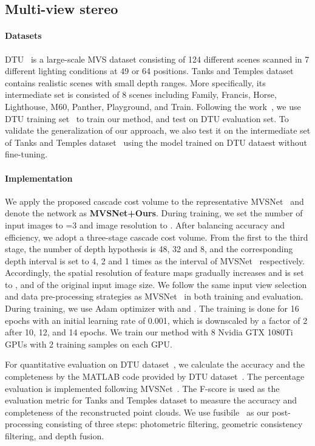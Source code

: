 \documentclass[10pt,twocolumn,letterpaper]{article}
\begin{document}
\subsection{Multi-view stereo} 
\paragraph{Datasets}
DTU~\cite{aanaes2016dtu} is a large-scale MVS dataset consisting of 124 different scenes scanned in 7 different lighting conditions at 49 or 64 positions. Tanks and Temples dataset~\cite{knapitsch2017tanks} contains realistic scenes with small depth ranges.
More specifically, its intermediate set is consisted of 8 scenes including Family, Francis, Horse, Lighthouse, M60, Panther, Playground, and Train.
Following the work~\cite{yao2019recurrent}, we use DTU training set~\cite{aanaes2016dtu} to train our method,
and test on DTU evaluation set.
To validate the generalization of our approach, we also test it on the intermediate set of Tanks and Temples dataset~\cite{knapitsch2017tanks} using the model trained on DTU dataest without fine-tuning.


\paragraph{Implementation}\vspace{-2mm}
We apply the proposed cascade cost volume to the representative MVSNet~\cite{yao2018mvsnet} and denote the network as \textbf{MVSNet+Ours}.
During training, we set the number of input images to =3 and image resolution to .
After balancing accuracy and efficiency, we adopt a three-stage cascade cost volume.
From the first to the third stage, the number of depth hypothesis is 48, 32 and 8, and the corresponding depth interval is set to 4, 2 and 1  times as the interval of MVSNet~\cite{yao2018mvsnet} respectively.
Accordingly, the spatial resolution of feature maps gradually increases and is set to ,  and  of the original input image size.
We follow the same input view selection and data pre-processing strategies as MVSNet~\cite{yao2018mvsnet} in both training and evaluation.
During training, we use Adam optimizer with  and .
The training is done for 16 epochs with an initial learning rate of 0.001, which is downscaled by a factor of 2 after 10, 12, and 14 epochs.
We train our method with 8 Nvidia GTX 1080Ti GPUs with 2 training samples on each GPU. 

For quantitative evaluation on DTU dataset~\cite{aanaes2016dtu}, we calculate the accuracy and the completeness by the MATLAB code provided by DTU dataset~\cite{aanaes2016dtu}. The percentage evaluation is implemented following MVSNet~\cite{yao2018mvsnet}. 
The F-score is used as the evaluation metric for Tanks and Temples dataset \cite{knapitsch2017tanks} to measure the accuracy and completeness of the reconstructed point clouds. 
We use fusibile~\cite{fusible} as our post-processing consisting of three steps: photometric filtering, geometric consistency filtering, and depth fusion.
\end{document}
